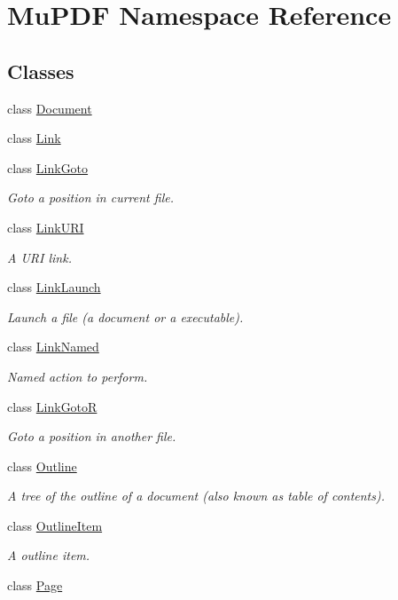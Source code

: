 \hypertarget{namespace_mu_p_d_f}{\section{Mu\-P\-D\-F Namespace Reference}
\label{namespace_mu_p_d_f}
}
\subsection*{Classes}
\begin{DoxyCompactItemize}
\item 
class \hyperlink{class_mu_p_d_f_1_1_document}{Document}
\item 
class \hyperlink{class_mu_p_d_f_1_1_link}{Link}
\item 
class \hyperlink{class_mu_p_d_f_1_1_link_goto}{Link\-Goto}
\begin{DoxyCompactList}\small\item\em Goto a position in current file. \end{DoxyCompactList}\item 
class \hyperlink{class_mu_p_d_f_1_1_link_u_r_i}{Link\-U\-R\-I}
\begin{DoxyCompactList}\small\item\em A U\-R\-I link. \end{DoxyCompactList}\item 
class \hyperlink{class_mu_p_d_f_1_1_link_launch}{Link\-Launch}
\begin{DoxyCompactList}\small\item\em Launch a file (a document or a executable). \end{DoxyCompactList}\item 
class \hyperlink{class_mu_p_d_f_1_1_link_named}{Link\-Named}
\begin{DoxyCompactList}\small\item\em Named action to perform. \end{DoxyCompactList}\item 
class \hyperlink{class_mu_p_d_f_1_1_link_goto_r}{Link\-Goto\-R}
\begin{DoxyCompactList}\small\item\em Goto a position in another file. \end{DoxyCompactList}\item 
class \hyperlink{class_mu_p_d_f_1_1_outline}{Outline}
\begin{DoxyCompactList}\small\item\em A tree of the outline of a document (also known as table of contents). \end{DoxyCompactList}\item 
class \hyperlink{class_mu_p_d_f_1_1_outline_item}{Outline\-Item}
\begin{DoxyCompactList}\small\item\em A outline item. \end{DoxyCompactList}\item 
class \hyperlink{class_mu_p_d_f_1_1_page}{Page}
\end{DoxyCompactItemize}
